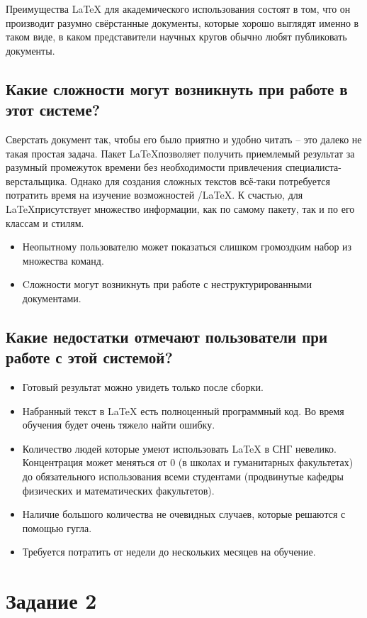 \documentclass[a4paper,12pt]{article} %
\begin{document}
Преимущества LaTeX для академического использования состоят в том, что он производит разумно свёрстанные документы, которые хорошо выглядят именно в таком виде, в каком представители научных кругов обычно любят публиковать документы.

\subsection{Какие сложности могут возникнуть при работе в этот системе?}

Сверстать документ так, чтобы его было приятно и удобно читать – это далеко не такая простая задача. Пакет \LaTeX позволяет получить приемлемый результат за разумный промежуток времени без необходимости привлечения специалиста-верстальщика. Однако для создания сложных текстов всё-таки потребуется потратить время на изучение возможностей /\LaTeX. К счастью, для \LaTeX присутствует множество информации, как по самому пакету, так и по его классам и стилям.
\begin{itemize}
\item Неопытному пользователю может показаться слишком громоздким набор из множества команд. 
\item Cложности могут возникнуть при работе с неструктурированными документами.  
\end{itemize}

\subsection{Какие недостатки отмечают пользователи при работе с этой системой?}
\begin{itemize}
\item Готовый результат можно увидеть только после сборки.
\item Набранный текст в  LaTeX есть полноценный программный код. Во время обучения будет очень тяжело найти ошибку.
\item Количество людей которые умеют использовать LaTeX в СНГ невелико. Концентрация может меняться от 0 (в школах и гуманитарных факультетах) до обязательного использования всеми студентами (продвинутые кафедры физических и математических факультетов).
\item Наличие большого количества не очевидных случаев, которые решаются с помощью гугла.
\item Требуется потратить от недели до нескольких месяцев на обучение.
\end{itemize}

\section{Задание 2}
\end{document}
